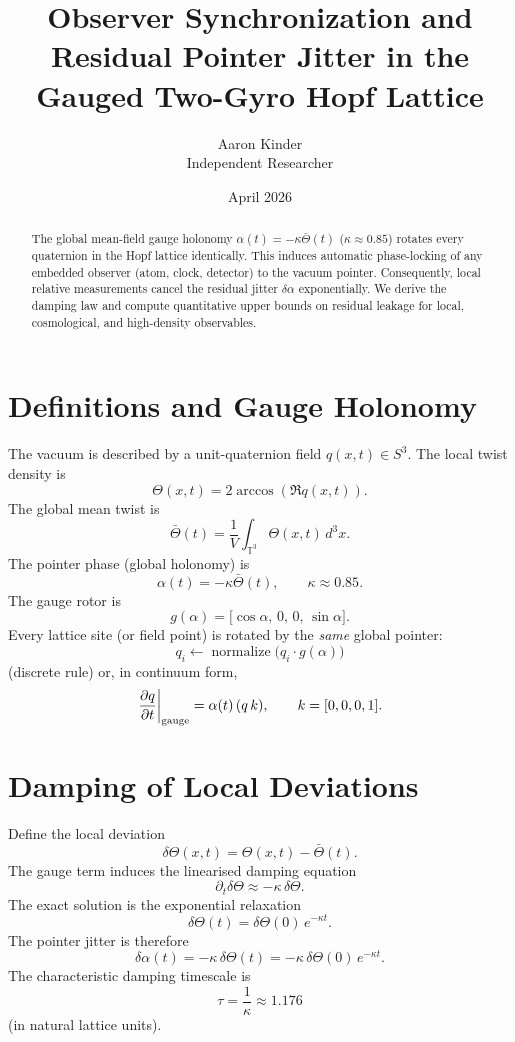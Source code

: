 \documentclass[11pt]{article}
\title{Observer Synchronization and Residual Pointer Jitter in the Gauged Two-Gyro Hopf Lattice}
\author{Aaron Kinder \\ Independent Researcher}
\date{April 2026}
\begin{document}
\maketitle

\begin{abstract}
The global mean-field gauge holonomy \(\alpha(t)=-\kappa\bar{\Theta}(t)\) (\(\kappa\approx0.85\)) rotates every quaternion in the Hopf lattice identically. This induces automatic phase-locking of any embedded observer (atom, clock, detector) to the vacuum pointer. Consequently, local relative measurements cancel the residual jitter \(\delta\alpha\) exponentially. We derive the damping law and compute quantitative upper bounds on residual leakage for local, cosmological, and high-density observables.
\end{abstract}

\section{Definitions and Gauge Holonomy}

The vacuum is described by a unit-quaternion field \(q(x,t)\in S^3\). The local twist density is
\[
\Theta(x,t)=2\arccos(\Re q(x,t)).
\]
The global mean twist is
\[
\bar{\Theta}(t)=\frac{1}{V}\int_{\mathbb{T}^3}\Theta(x,t)\,d^3x.
\]
The pointer phase (global holonomy) is
\[
\alpha(t)=-\kappa\bar{\Theta}(t),\qquad\kappa\approx0.85.
\]
The gauge rotor is
\[
g(\alpha)=\bigl[\cos\alpha,\,0,\,0,\,\sin\alpha\bigr].
\]
Every lattice site (or field point) is rotated by the \emph{same} global pointer:
\[
q_i\leftarrow\operatorname{normalize}\bigl(q_i\cdot g(\alpha)\bigr)
\]
(discrete rule) or, in continuum form,
\[
\left.\frac{\partial q}{\partial t}\right|_{\rm gauge}=\alpha(t)\,(q\,k),\qquad k=[0,0,0,1].
\]

\section{Damping of Local Deviations}

Define the local deviation
\[
\delta\Theta(x,t)=\Theta(x,t)-\bar{\Theta}(t).
\]
The gauge term induces the linearised damping equation
\[
\partial_t\delta\Theta\approx-\kappa\,\delta\Theta.
\]
The exact solution is the exponential relaxation
\[
\delta\Theta(t)=\delta\Theta(0)\,e^{-\kappa t}.
\]
The pointer jitter is therefore
\[
\delta\alpha(t)=-\kappa\,\delta\Theta(t)=-\kappa\,\delta\Theta(0)\,e^{-\kappa t}.
\]
The characteristic damping timescale is
\[
\tau=\frac{1}{\kappa}\approx1.176
\]
(in natural lattice units).
\end{document}
